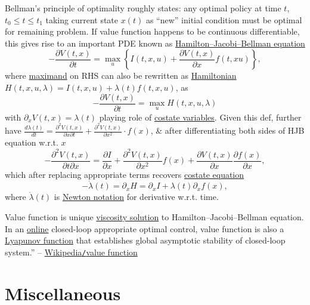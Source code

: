 \documentclass{article}
\begin{document}
{\sc Bellman}'s principle of optimality roughly states: any optimal policy at time $t$, $t_0\le t\le t_1$ taking current state $x(t)$ as ``new'' initial condition must be optimal for remaining problem. If value function happens to be continuous differentiable, this gives rise to an important PDE known as \href{https://en.wikipedia.org/wiki/Hamilton%E2%80%93Jacobi%E2%80%93Bellman_equation}{Hamilton--Jacobi--Bellman equation}
\begin{equation*}
	-\frac{\partial V(t,x)}{\partial t} = \max_u \left\{I(t,x,u) + \frac{\partial V(t,x)}{\partial x}f(t,xu)\right\},
\end{equation*}
where \href{https://en.wiktionary.org/wiki/maximand}{maximand} on RHS can also be rewritten as \href{https://en.wikipedia.org/wiki/Hamiltonian_(control_theory)}{Hamiltonian} $H(t,x,u,\lambda) = I(t,x,u) + \lambda(t)f(t,x,u)$, as
\begin{equation*}
	-\frac{\partial V(t,x)}{\partial t} = \max_u H(t,x,u,\lambda)
\end{equation*}
with $\partial_xV(t,x) = \lambda(t)$ playing role of \href{https://en.wikipedia.org/wiki/Costate_variable}{costate variables}. Given this def, further have $\frac{d\lambda(t)}{dt} = \frac{\partial^2V(t,x)}{\partial x\partial t} + \frac{\partial^2V(t,x)}{\partial x^2}\cdot f(x)$, \& after differentiating both sides of HJB equation w.r.t. $x$
\begin{equation*}
	-\frac{\partial^2V(t,x)}{\partial t\partial x} = \frac{\partial I}{\partial x} + \frac{\partial^2V(t,x)}{\partial x^2}f(x) + \frac{\partial V(t,x)}{\partial x}\frac{\partial f(x)}{\partial x},
\end{equation*}
which after replacing appropriate terms recovers \href{https://en.wikipedia.org/wiki/Costate_equation}{costate equation}
\begin{equation*}
	-\dot{\lambda}(t) = \partial_xH = \partial_xI + \lambda(t)\partial_xf(x),
\end{equation*}
where $\dot{\lambda}(t)$ is \href{https://en.wikipedia.org/wiki/Newton_notation}{Newton notation} for derivative w.r.t. time.

Value function is unique \href{https://en.wikipedia.org/wiki/Viscosity_solution}{viscosity solution} to Hamilton--Jacobi--Bellman equation. In an \href{https://en.wikipedia.org/wiki/Online_algorithm}{online} closed-loop appropriate optimal control, value function is also a \href{https://en.wikipedia.org/wiki/Lyapunov_function}{Lyapunov function} that establishes global asymptotic stability of closed-loop system.'' -- \href{https://en.wikipedia.org/wiki/Value_function}{Wikipedia{\tt/}value function}


\section{Miscellaneous}


\printbibliography[heading=bibintoc]
	
\end{document}
